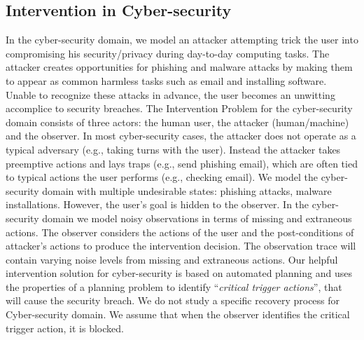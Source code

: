 \subsection{Intervention in Cyber-security}
In the cyber-security domain, we model an attacker attempting trick the user into compromising his security/privacy during day-to-day computing tasks.
The attacker creates opportunities for phishing and malware attacks by making them to appear as common harmless tasks such as email and installing software.
Unable to recognize these attacks in advance, the user becomes an unwitting accomplice to security breaches. 
The Intervention Problem for the cyber-security domain consists of three actors: the human user, the attacker (human/machine) and the observer. 
In most cyber-security cases, the attacker does not operate as a typical adversary (e.g., taking turns with the user). 
Instead the attacker takes preemptive actions and lays traps (e.g., send phishing email), which are often tied to typical actions the user performs (e.g., checking email). 
We model the cyber-security domain with multiple undesirable states: phishing attacks, malware installations. However, the user's goal is hidden to the observer.
In the cyber-security domain we model noisy observations in terms of missing and extraneous actions.
The observer considers the actions of the user and the post-conditions of attacker's actions to produce the intervention decision. 
The observation trace will contain varying noise levels from missing and extraneous actions.
Our helpful intervention solution for cyber-security is based on automated planning and uses the properties of a planning problem to identify ``\textit{critical trigger actions}'', that will cause the security breach. 
We do not study a specific recovery process for Cyber-security domain. 
We assume that when the observer identifies the critical trigger action, it is blocked.

